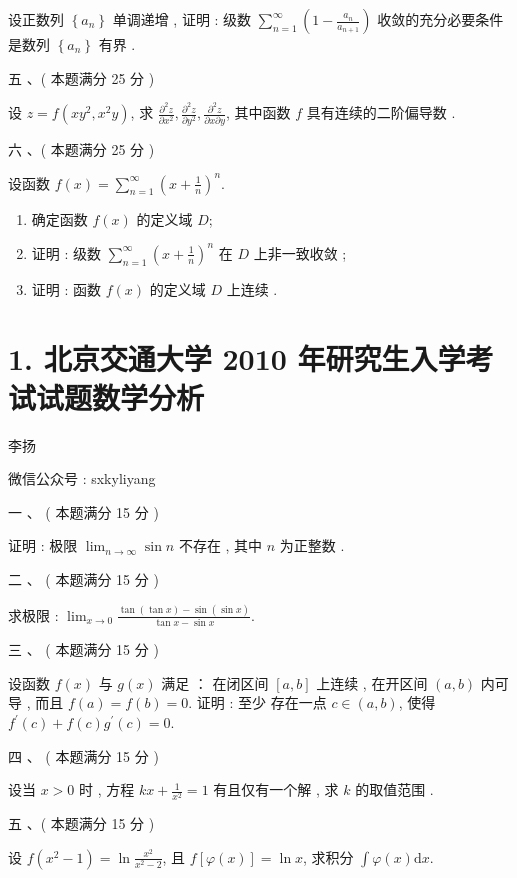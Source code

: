 \documentclass[10pt]{article}
\begin{document}
{ 设正数列  $\left\{a_{n}\right\}$  单调递增 ,  证明 :  级数  $\sum_{n=1}^{\infty}\left(1-\frac{a_{n}}{a_{n+1}}\right)$  收敛的充分必要条件是数列  $\left\{a_{n}\right\}$  有界 .

 五 、( 本题满分  25  分 )

 设  $z=f\left(x y^{2}, x^{2} y\right)$,  求  $\frac{\partial^{2} z}{\partial x^{2}}, \frac{\partial^{2} z}{\partial y^{2}}, \frac{\partial^{2} z}{\partial x \partial y}$,  其中函数  $f$  具有连续的二阶偏导数 .

 六 、( 本题满分  25  分 )

 设函数  $f(x)=\sum_{n=1}^{\infty}\left(x+\frac{1}{n}\right)^{n}$.

\begin{enumerate}
  \item  确定函数  $f(x)$  的定义域  $D$;

  \item  证明 :  级数  $\sum_{n=1}^{\infty}\left(x+\frac{1}{n}\right)^{n}$  在  $D$  上非一致收敛 ;

  \item  证明 :  函数  $f(x)$  的定义域  $D$  上连续 .

\end{enumerate}
\section{1. 北京交通大学 2010 年研究生入学考试试题数学分析}
 李扬 

 微信公众号 : sxkyliyang

 一 、 ( 本题满分  15  分 )

 证明 :  极限  $\lim _{n \rightarrow \infty} \sin n$  不存在 ,  其中  $n$  为正整数 .

 二 、 ( 本题满分  15  分 )

 求极限 : $\lim _{x \rightarrow 0} \frac{\tan (\tan x)-\sin (\sin x)}{\tan x-\sin x}$.

 三 、 ( 本题满分  15  分 )

 设函数  $f(x)$  与  $g(x)$  满足 ： 在闭区间  $[a, b]$  上连续 ,  在开区间  $(a, b)$  内可导 ,  而且  $f(a)=f(b)=0$.  证明 :  至少   存在一点  $c \in(a, b)$,  使得  $f^{\prime}(c)+f(c) g^{\prime}(c)=0$.

 四 、 ( 本题满分  15  分 )

 设当  $x>0$  时 ,  方程  $k x+\frac{1}{x^{2}}=1$  有且仅有一个解 ,  求  $k$  的取值范围 .

 五 、( 本题满分  15  分 )

 设  $f\left(x^{2}-1\right)=\ln \frac{x^{2}}{x^{2}-2}$,  且  $f[\varphi(x)]=\ln x$,  求积分  $\int \varphi(x) \mathrm{d} x$.

}
\end{document}
